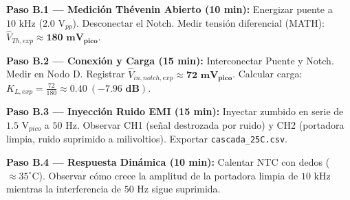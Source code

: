 \documentclass[11pt,a4paper,twoside]{article}
\begin{document}
\textbf{Paso B.1 — Medición Thévenin Abierto (10 min):} Energizar puente a $10\text{ kHz}$ ($2.0\text{ V}_{pp}$). Desconectar el Notch. Medir tensión diferencial (MATH): $\hat{V}_{Th, exp} \approx \mathbf{180\text{ mV}_{pico}}$.

\textbf{Paso B.2 — Conexión y Carga (15 min):} Interconectar Puente y Notch. Medir en Nodo D. Registrar $\hat{V}_{in, notch, exp} \approx \mathbf{72\text{ mV}_{pico}}$. Calcular carga: $K_{L, exp} = \frac{72}{180} \approx \mathbf{0.40} \ (\mathbf{-7.96\text{ dB}})$.

\textbf{Paso B.3 — Inyección Ruido EMI (15 min):} Inyectar zumbido en serie de $1.5\text{ V}_{pico}$ a $50\text{ Hz}$. Observar CH1 (señal destrozada por ruido) y CH2 (portadora limpia, ruido suprimido a milivoltios). Exportar \texttt{cascada\_25C.csv}.

\textbf{Paso B.4 — Respuesta Dinámica (10 min):} Calentar NTC con dedos ($\approx 35^\circ\text{C}$). Observar cómo crece la amplitud de la portadora limpia de $10\text{ kHz}$ mientras la interferencia de $50\text{ Hz}$ sigue suprimida.

\newpage
\end{document}
